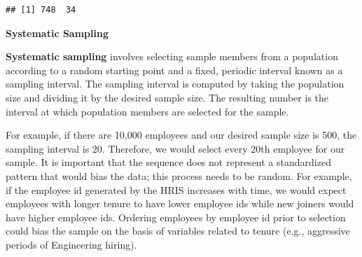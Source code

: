 \documentclass[]{book}
\newenvironment{Shaded}{\begin{snugshade}}{\end{snugshade}}
\newcommand{\CommentTok}[1]{\textcolor[rgb]{0.56,0.35,0.01}{\textit{#1}}}
\newcommand{\DataTypeTok}[1]{\textcolor[rgb]{0.13,0.29,0.53}{#1}}
\newcommand{\DecValTok}[1]{\textcolor[rgb]{0.00,0.00,0.81}{#1}}
\newcommand{\KeywordTok}[1]{\textcolor[rgb]{0.13,0.29,0.53}{\textbf{#1}}}
\newcommand{\NormalTok}[1]{#1}
\newcommand{\OperatorTok}[1]{\textcolor[rgb]{0.81,0.36,0.00}{\textbf{#1}}}
\newcommand{\StringTok}[1]{\textcolor[rgb]{0.31,0.60,0.02}{#1}}
\begin{document}
\begin{Shaded}
\end{Shaded}

\begin{verbatim}
## [1] 748  34
\end{verbatim}

\textbf{Systematic Sampling}

\textbf{Systematic sampling} involves selecting sample members from a population according to a random starting point and a fixed, periodic interval known as a sampling interval. The sampling interval is computed by taking the population size and dividing it by the desired sample size. The resulting number is the interval at which population members are selected for the sample.

For example, if there are 10,000 employees and our desired sample size is 500, the sampling interval is 20. Therefore, we would select every 20th employee for our sample. It is important that the sequence does not represent a standardized pattern that would bias the data; this process needs to be random. For example, if the employee id generated by the HRIS increases with time, we would expect employees with longer tenure to have lower employee ids while new joiners would have higher employee ids. Ordering employees by employee id prior to selection could bias the sample on the basis of variables related to tenure (e.g., aggressive periods of Engineering hiring).
\end{document}
